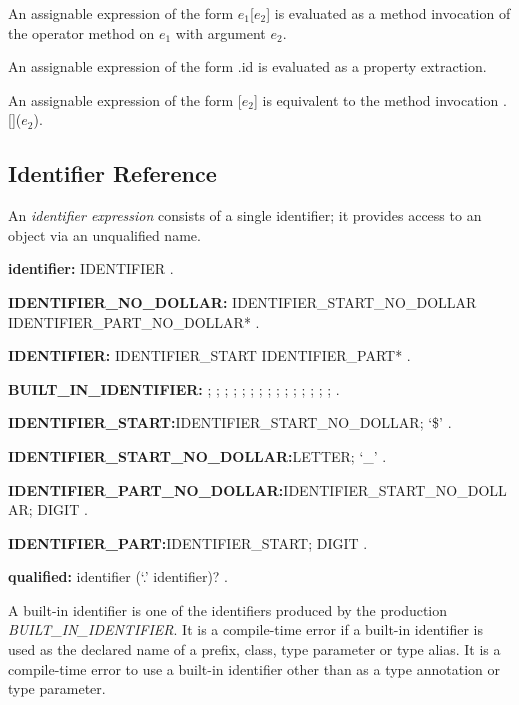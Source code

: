 \documentclass{article}
\newcommand{\code}[1]{{\sf #1}}
\begin{document}
\LMHash{}
An assignable expression of the form \code{$e_1$[$e_2$]} is evaluated as a method invocation of the operator method \code{[]} on $e_1$ with argument $e_2$.

\LMHash{}
An assignable expression of the form \code{\SUPER{}.id}  is evaluated as a property extraction.

\LMHash{}
An assignable expression of the form \code{\SUPER{}[$e_2$]} is equivalent to the method invocation  \code{\SUPER{}.[]($e_2$)}.

\subsection{ Identifier Reference}

\LMHash{}
An {\em identifier expression} consists of a single identifier; it provides access to an object via an unqualified name.

\begin{grammar}
{\bf identifier:}
     IDENTIFIER
     .
     
         
 {\bf IDENTIFIER\_NO\_DOLLAR:}
      IDENTIFIER\_START\_NO\_DOLLAR IDENTIFIER\_PART\_NO\_DOLLAR*
    .

{\bf IDENTIFIER:}
      IDENTIFIER\_START IDENTIFIER\_PART*
    .

{\bf BUILT\_IN\_IDENTIFIER:} \ABSTRACT{};
     \AS{};
     \DEFERRED{};
     \DYNAMIC{};
     \EXPORT{};
     \EXTERNAL{};
     \FACTORY{};
     \GET{};
     \IMPLEMENTS{};
     \IMPORT{};
     \LIBRARY{};
     \OPERATOR{};
     \PART{};
      \SET{};
      \STATIC{};
     \TYPEDEF{}
    .

 {\bf IDENTIFIER\_START:}IDENTIFIER\_START\_NO\_DOLLAR;
      `\$'
    .

{\bf IDENTIFIER\_START\_NO\_DOLLAR:}LETTER;
      `\_'
    .

{\bf  IDENTIFIER\_PART\_NO\_DOLLAR:}IDENTIFIER\_START\_NO\_DOLLAR;
      DIGIT
    .


{\bf IDENTIFIER\_PART:}IDENTIFIER\_START;
      DIGIT
    .



{\bf qualified:}
      identifier (`{\escapegrammar .}' identifier)?  
      . 
\end{grammar}

\LMHash{}
A built-in identifier is one of the identifiers produced by the production {\em BUILT\_IN\_IDENTIFIER}. It is a compile-time error if a built-in identifier is used as the declared name of a prefix, class, type parameter or type alias. It is a compile-time error to use a built-in identifier other than \DYNAMIC{} as a type annotation or type parameter.
\end{document}
